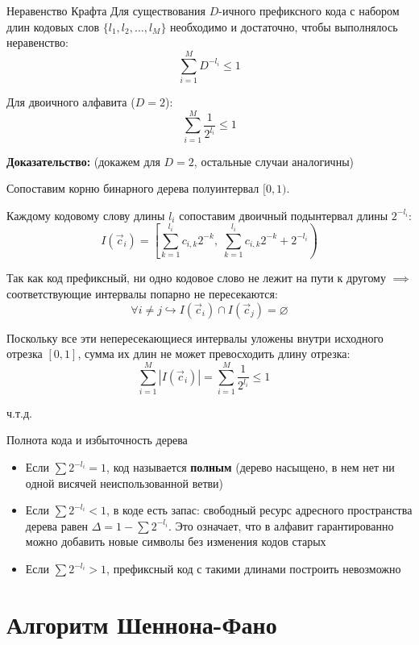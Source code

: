 \documentclass[11pt,a4paper]{article}
\begin{document}
\begin{theorembox}{Неравенство Крафта}
Для существования $D$-ичного префиксного кода с набором длин кодовых слов $\{l_1, l_2, \dots, l_M\}$ необходимо и достаточно, чтобы выполнялось неравенство:
$$\sum_{i=1}^M D^{-l_i} \le 1$$

Для двоичного алфавита ($D = 2$):
$$\sum_{i=1}^M \frac{1}{2^{l_i}} \le 1$$

\tcblower

\textbf{Доказательство:} (докажем для $D = 2$, остальные случаи аналогичны)

Сопоставим корню бинарного дерева полуинтервал $[0, 1)$.

Каждому кодовому слову длины $l_i$ сопоставим двоичный подынтервал длины $2^{-l_i}$:
$$I(\vec{c}_i) = \left[ \sum_{k=1}^{l_i} c_{i,k} 2^{-k}, \; \sum_{k=1}^{l_i} c_{i,k} 2^{-k} + 2^{-l_i} \right)$$

Так как код префиксный, ни одно кодовое слово не лежит на пути к другому $\implies$ соответствующие интервалы попарно не пересекаются:
$$\forall i \neq j \hookrightarrow I(\vec{c}_i) \cap I(\vec{c}_j) = \varnothing$$

Поскольку все эти непересекающиеся интервалы уложены внутри исходного отрезка $[0, 1]$, сумма их длин не может превосходить длину отрезка:
$$\sum_{i=1}^M |I(\vec{c}_i)| = \sum_{i=1}^M \frac{1}{2^{l_i}} \le 1 \quad$$

ч.т.д.
\end{theorembox}

\begin{infobox}{Полнота кода и избыточность дерева}
\begin{itemize}
    \item Если $\sum 2^{-l_i} = 1$, код называется \textbf{полным} (дерево насыщено, в нем нет ни одной висячей неиспользованной ветви)
    \item Если $\sum 2^{-l_i} < 1$, в коде есть запас: свободный ресурс адресного пространства дерева равен $\Delta = 1 - \sum 2^{-l_i}$. Это означает, что в алфавит гарантированно можно добавить новые символы без изменения кодов старых
    \item Если $\sum 2^{-l_i} > 1$, префиксный код с такими длинами построить невозможно
\end{itemize}
\end{infobox}

\section{Алгоритм Шеннона-Фано}
\end{document}
